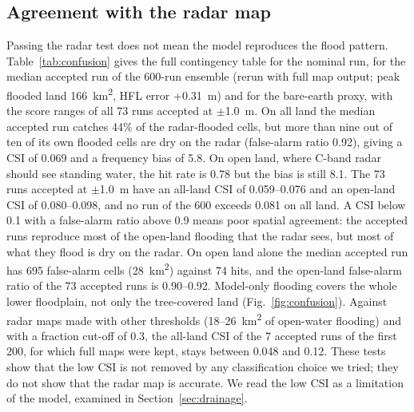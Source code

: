 \documentclass[preprint,12pt,authoryear]{elsarticle}
\newcommand{\kmsq}{km\textsuperscript{2}}
\begin{document}
\subsection{Agreement with the radar map}
\label{sec:radar}
Passing the radar test does not mean the model reproduces the flood pattern. Table~\ref{tab:confusion} gives the full contingency table for the nominal run, for the median accepted run of the 600-run ensemble (rerun with full map output; peak flooded land 166~\kmsq, HFL error +0.31~m) and for the bare-earth proxy, with the score ranges of all 73 runs accepted at $\pm$1.0~m. On all land the median accepted run catches 44\% of the radar-flooded cells, but more than nine out of ten of its own flooded cells are dry on the radar (false-alarm ratio 0.92), giving a CSI of 0.069 and a frequency bias of 5.8. On open land, where C-band radar should see standing water, the hit rate is 0.78 but the bias is still 8.1. The 73 runs accepted at $\pm$1.0~m have an all-land CSI of 0.059--0.076 and an open-land CSI of 0.080--0.098, and no run of the 600 exceeds 0.081 on all land. A CSI below 0.1 with a false-alarm ratio above 0.9 means poor spatial agreement: the accepted runs reproduce most of the open-land flooding that the radar sees, but most of what they flood is dry on the radar. On open land alone the median accepted run has 695 false-alarm cells (28~\kmsq) against 74 hits, and the open-land false-alarm ratio of the 73 accepted runs is 0.90--0.92. Model-only flooding covers the whole lower floodplain, not only the tree-covered land (Fig.~\ref{fig:confusion}). Against radar maps made with other thresholds (18--26~\kmsq{} of open-water flooding) and with a fraction cut-off of 0.3, the all-land CSI of the 7 accepted runs of the first 200, for which full maps were kept, stays between 0.048 and 0.12. These tests show that the low CSI is not removed by any classification choice we tried; they do not show that the radar map is accurate. We read the low CSI as a limitation of the model, examined in Section~\ref{sec:drainage}.
\end{document}
